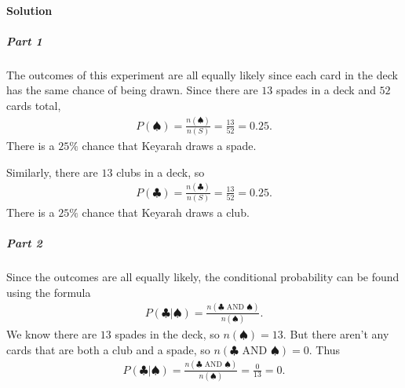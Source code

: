 \documentclass[letterpaper,10pt,english]{jupyterBook}
\begin{document}
\paragraph{Solution}
\label{\detokenize{Ch3 Probability/3.4 Addition Rules and Mutually Exclusive Events:id1}}

\subparagraph{Part 1}
\label{\detokenize{Ch3 Probability/3.4 Addition Rules and Mutually Exclusive Events:id2}}
\sphinxAtStartPar
The outcomes of this experiment are all equally likely since each card in the deck has the same chance of being drawn. Since there are \(13\) spades in a deck and \(52\) cards total,
\begin{equation*}
\begin{split} P(♠) = \frac{n(♠)}{n(S)} = \frac{13}{52} = 0.25. \end{split}
\end{equation*}
\sphinxAtStartPar
There is a \(25\%\) chance that Keyarah draws a spade.

\sphinxAtStartPar
Similarly, there are \(13\) clubs in a deck, so
\begin{equation*}
\begin{split} P(♣) = \frac{n(♣)}{n(S)} = \frac{13}{52} = 0.25. \end{split}
\end{equation*}
\sphinxAtStartPar
There is a \(25\%\) chance that Keyarah draws a club.


\subparagraph{Part 2}
\label{\detokenize{Ch3 Probability/3.4 Addition Rules and Mutually Exclusive Events:id3}}
\sphinxAtStartPar
Since the outcomes are all equally likely, the conditional probability can be found using the formula
\begin{equation*}
\begin{split} P(♣|♠) = \frac{n(♣ \text{ AND } ♠)}{n(♠)}. \end{split}
\end{equation*}
\sphinxAtStartPar
We know there are \(13\) spades in the deck, so \(n(♠) = 13\). But there aren’t any cards that are both a club and a spade, so \(n(♣ \text{ AND } ♠) = 0\). Thus
\begin{equation*}
\begin{split} P(♣|♠) = \frac{n(♣ \text{ AND } ♠)}{n(♠)} = \frac{0}{13} = 0. \end{split}
\end{equation*}
\end{document}
